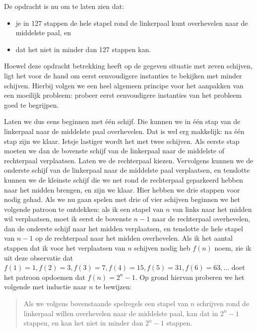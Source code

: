De opdracht is nu om te laten zien dat:
\begin{itemize}
    \item je in 127 stappen de hele stapel rond de linkerpaal kunt overhevelen naar de middelste paal, en
    \item dat het niet in minder dan 127 stappen kan.
\end{itemize}
Hoewel deze opdracht betrekking heeft op de gegeven situatie met zeven schijven, ligt het voor de hand om eerst eenvoudigere instanties te bekijken met minder schijven. Hierbij volgen we een heel algemeen principe voor het aanpakken van een moeilijk probleem: probeer eerst eenvoudigere instanties van het probleem goed te begrijpen.

Laten we dus eens beginnen met \'e\'en schijf. Die kunnen we in \'e\'en stap van de linkerpaal naar de middelste paal overhevelen. Dat is wel erg makkelijk: na \'e\'en stap zijn we klaar. Ietsje lastiger wordt het met twee schijven. Als eerste stap moeten we dan de bovenste schijf van de linkerpaal naar de middelste of rechterpaal verplaatsen. Laten we de rechterpaal kiezen. Vervolgens kunnen we de onderste schijf van de linkerpaal naar de middelste paal  verplaatsen, en tenslotte kunnen we de kleinste schijf die we net rond de rechterpaal geparkeerd hebben naar het midden brengen, en zijn we klaar. Hier hebben we drie stappen voor nodig gehad. Als we nu gaan spelen met drie of vier schijven beginnen we het volgende patroon te ontdekken: als ik een stapel van $n$ van links naar het midden wil verplaatsen, moet ik eerst de bovenste $n-1$ naar de rechterpaal overhevelen, dan de onderste schijf naar het midden verplaatsen, en tenslotte de hele stapel van $n-1$ op de rechterpaal naar het midden overhevelen. Als ik het aantal stappen dat ik voor het verplaatsen van $n$ schijven nodig heb $f(n)$ noem, zie ik uit deze observatie dat $f(1)=1, f(2)=3, f(3)=7, f(4)=15, f(5)=31, f(6)=63,\ldots$ doet het patroon opdoemen dat $f(n)=2^n-1$. Op grond hiervan proberen we het volgende met inductie naar $n$ te bewijzen:
\begin{quote}
    Als we volgens bovenstaande spelregels een stapel van $n$ schrijven rond de linkerpaal willen overhevelen naar de middelste paal, kan dat in $2^n-1$ stappen, en kan het niet in minder dan $2^n-1$ stappen.
\end{quote}
